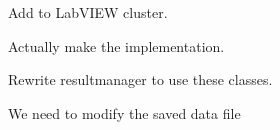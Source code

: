 
\begin{DoxyRefList}
\item[\label{todo__todo000001}%
\hypertarget{todo__todo000001}{}%
Member \hyperlink{struct_q_trk_settings_aef52bd8e2fdba83af4ce3b4367180d9f}{Q\+Trk\+Settings\+:\+:test\+Run} ]Add to Lab\+V\+I\+EW cluster.  
\item[\label{todo__todo000003}%
\hypertarget{todo__todo000003}{}%
Class \hyperlink{class_result_file}{Result\+File} ]Actually make the implementation. 

Rewrite resultmanager to use these classes.  
\item[\label{todo__todo000002}%
\hypertarget{todo__todo000002}{}%
Member \hyperlink{class_result_manager_aaa749abf3e879376677dc051745ed665}{Result\+Manager\+:\+:Remove\+Bead\+Results} (int bead)]We need to modify the saved data file 
\end{DoxyRefList}